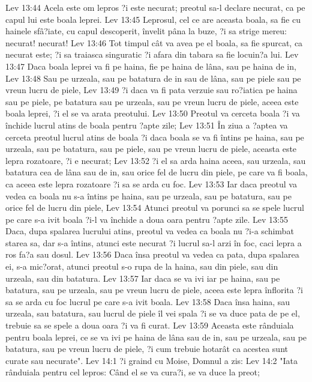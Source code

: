 Lev 13:44  Acela este om lepros ?i este necurat; preotul sa-l declare necurat, ca pe capul lui este boala leprei.
Lev 13:45  Leprosul, cel ce are aceasta boala, sa fie cu hainele sfâ?iate, cu capul descoperit, învelit pâna la buze, ?i sa strige mereu: necurat! necurat!
Lev 13:46  Tot timpul cât va avea pe el boala, sa fie spurcat, ca necurat este; ?i sa traiasca singuratic ?i afara din tabara sa fie locuin?a lui.
Lev 13:47  Daca boala leprei va fi pe haina, fie pe haina de lâna, sau pe haina de in,
Lev 13:48  Sau pe urzeala, sau pe batatura de in sau de lâna, sau pe piele sau pe vreun lucru de piele,
Lev 13:49  ?i daca va fi pata verzuie sau ro?iatica pe haina sau pe piele, pe batatura sau pe urzeala, sau pe vreun lucru de piele, aceea este boala leprei, ?i el se va arata preotului.
Lev 13:50  Preotul va cerceta boala ?i va închide lucrul atins de boala pentru ?apte zile;
Lev 13:51  În ziua a ?aptea va cerceta preotul lucrul atins de boala ?i daca boala se va fi întins pe haina, sau pe urzeala, sau pe batatura, sau pe piele, sau pe vreun lucru de piele, aceasta este lepra rozatoare, ?i e necurat;
Lev 13:52  ?i el sa arda haina aceea, sau urzeala, sau batatura cea de lâna sau de in, sau orice fel de lucru din piele, pe care va fi boala, ca aceea este lepra rozatoare ?i sa se arda cu foc.
Lev 13:53  Iar daca preotul va vedea ca boala nu s-a întins pe haina, sau pe urzeala, sau pe batatura, sau pe orice fel de lucru din piele,
Lev 13:54  Atunci preotul va porunci sa se spele lucrul pe care s-a ivit boala ?i-l va închide a doua oara pentru ?apte zile.
Lev 13:55  Daca, dupa spalarea lucrului atins, preotul va vedea ca boala nu ?i-a schimbat starea sa, dar s-a întins, atunci este necurat ?i lucrul sa-l arzi în foc, caci lepra a ros fa?a sau dosul.
Lev 13:56  Daca însa preotul va vedea ca pata, dupa spalarea ei, s-a mic?orat, atunci preotul s-o rupa de la haina, sau din piele, sau din urzeala, sau din batatura.
Lev 13:57  Iar daca se va ivi iar pe haina, sau pe batatura, sau pe urzeala, sau pe vreun lucru de piele, aceea este lepra înflorita ?i sa se arda cu foc lucrul pe care s-a ivit boala.
Lev 13:58  Daca însa haina, sau urzeala, sau batatura, sau lucrul de piele îl vei spala ?i se va duce pata de pe el, trebuie sa se spele a doua oara ?i va fi curat.
Lev 13:59  Aceasta este rânduiala pentru boala leprei, ce se va ivi pe haina de lâna sau de in, sau pe urzeala, sau pe batatura, sau pe vreun lucru de piele, ?i cum trebuie hotarât ca acestea sunt curate sau necurate".
Lev 14:1  ?i graind cu Moise, Domnul a zis:
Lev 14:2  "Iata rânduiala pentru cel lepros: Când el se va cura?i, se va duce la preot;
